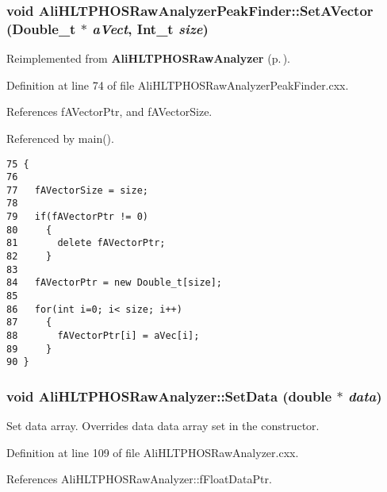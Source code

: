 \subsubsection{\setlength{\rightskip}{0pt plus 5cm}void Ali\-HLTPHOSRaw\-Analyzer\-Peak\-Finder::Set\-AVector (Double\_\-t $\ast$ {\em a\-Vect}, Int\_\-t {\em size})\hspace{0.3cm}{\tt  [virtual]}}\label{classAliHLTPHOSRawAnalyzerPeakFinder_AliHLTPHOSRawAnalyzerPeakFindera5}




Reimplemented from {\bf Ali\-HLTPHOSRaw\-Analyzer} {\rm (p.\,\pageref{classAliHLTPHOSRawAnalyzer_AliHLTPHOSRawAnalyzerLMSa17})}.

Definition at line 74 of file Ali\-HLTPHOSRaw\-Analyzer\-Peak\-Finder.cxx.

References f\-AVector\-Ptr, and f\-AVector\-Size.

Referenced by main().

\footnotesize\begin{verbatim}75 {
76     
77   fAVectorSize = size;
78 
79   if(fAVectorPtr != 0)
80     {
81       delete fAVectorPtr;
82     }
83   
84   fAVectorPtr = new Double_t[size];
85 
86   for(int i=0; i< size; i++)
87     {
88       fAVectorPtr[i] = aVec[i];
89     }
90 }
\end{verbatim}\normalsize 


\subsubsection{\setlength{\rightskip}{0pt plus 5cm}void Ali\-HLTPHOSRaw\-Analyzer::Set\-Data (double $\ast$ {\em data})\hspace{0.3cm}{\tt  [inherited]}}\label{classAliHLTPHOSRawAnalyzer_AliHLTPHOSRawAnalyzerPeakFindera12}


Set data array. Overrides data data array set in the constructor. 

Definition at line 109 of file Ali\-HLTPHOSRaw\-Analyzer.cxx.

References Ali\-HLTPHOSRaw\-Analyzer::f\-Float\-Data\-Ptr.

